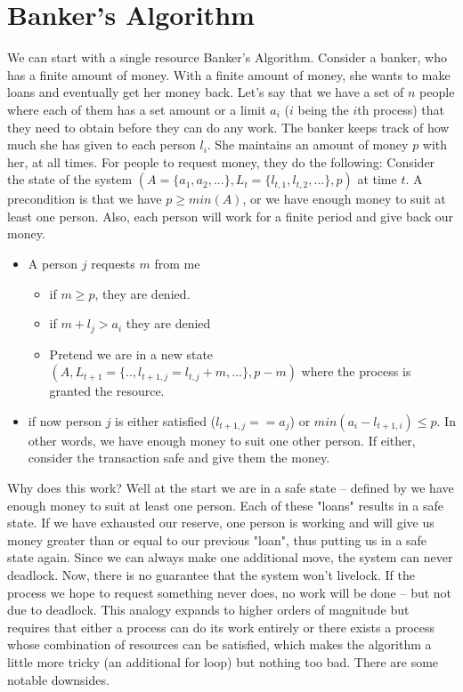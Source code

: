 \section{Banker's Algorithm}

We can start with a single resource Banker's Algorithm.
Consider a banker, who has a finite amount of money.
With a finite amount of money, she wants to make loans and eventually get her money back.
Let's say that we have a set of $n$ people where each of them has a set amount or a limit $a_i$ ($i$ being the $i$th process) that they need to obtain before they can do any work.
The banker keeps track of how much she has given to each person $l_i$. She maintains an amount of money $p$ with her, at all times.
For people to request money, they do the following:
Consider the state of the system $(A=\{a_1, a_2, ...\}, L_t=\{l_{t,1}, l_{t,2}, ...\}, p)$ at time $t$.
A precondition is that we have $p \geq min(A)$, or we have enough money to suit at least one person.
Also, each person will work for a finite period and give back our money.

\begin{itemize}
  \item A person $j$ requests $m$ from me
        \begin{itemize}
          \item if $m \geq p$, they are denied.
          \item if $m + l_j > a_i$ they are denied
          \item Pretend we are in a new state $(A, L_{t+1}=\{.., l_{t+1, j} = l_{t, j} + m, ...\}, p - m)$ where the process is granted the resource.
        \end{itemize}
  \item if now person $j$ is either satisfied ($l_{t+1,j} == a_j$) or $min(a_i - l_{t+1, i}) \leq p$. In other words, we have enough money to suit one other person. If either, consider the transaction safe and give them the money.
\end{itemize}

Why does this work? Well at the start we are in a safe state -- defined by we have enough money to suit at least one person.
Each of these "loans" results in a safe state.
If we have exhausted our reserve, one person is working and will give us money greater than or equal to our previous "loan", thus putting us in a safe state again.
Since we can always make one additional move, the system can never deadlock.
Now, there is no guarantee that the system won't livelock.
If the process we hope to request something never does, no work will be done -- but not due to deadlock.
This analogy expands to higher orders of magnitude but requires that either a process can do its work entirely or there exists a process whose combination of resources can be satisfied, which makes the algorithm a little more tricky (an additional for loop) but nothing too bad.
There are some notable downsides.

